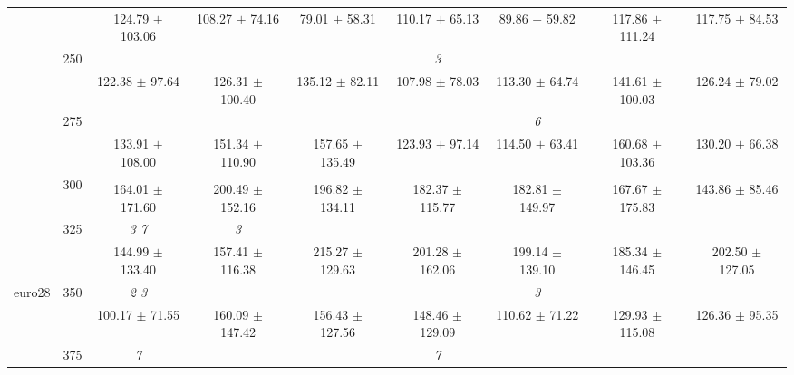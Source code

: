 \begin{table}[h]
{\begin{tabular}{
        ccccccccc}
 & & \cellcolor[HTML]{EFEFEF} 124.79 $\pm$ 103.06& \cellcolor[HTML]{EFEFEF} 108.27 $\pm$ 74.16& \cellcolor[HTML]{EFEFEF} 79.01 $\pm$ 58.31& \cellcolor[HTML]{EFEFEF} 110.17 $\pm$ 65.13& \cellcolor[HTML]{EFEFEF} 89.86 $\pm$ 59.82& \cellcolor[HTML]{EFEFEF} 117.86 $\pm$ 111.24& \cellcolor[HTML]{EFEFEF} 117.75 $\pm$ 84.53 \\ 
 & \multirow{2}{*}{250}& & & & \textit{ 3 }& & &  \\ 
 & & 122.38 $\pm$ 97.64& 126.31 $\pm$ 100.40& 135.12 $\pm$ 82.11& 107.98 $\pm$ 78.03& 113.30 $\pm$ 64.74& 141.61 $\pm$ 100.03& 126.24 $\pm$ 79.02 \\ 
 & \multirow{2}{*}{275}& \cellcolor[HTML]{EFEFEF} & \cellcolor[HTML]{EFEFEF} & \cellcolor[HTML]{EFEFEF} & \cellcolor[HTML]{EFEFEF} & \cellcolor[HTML]{EFEFEF} \textit{ 6 }& \cellcolor[HTML]{EFEFEF} & \cellcolor[HTML]{EFEFEF}  \\ 
 & & \cellcolor[HTML]{EFEFEF} 133.91 $\pm$ 108.00& \cellcolor[HTML]{EFEFEF} 151.34 $\pm$ 110.90& \cellcolor[HTML]{EFEFEF} 157.65 $\pm$ 135.49& \cellcolor[HTML]{EFEFEF} 123.93 $\pm$ 97.14& \cellcolor[HTML]{EFEFEF} 114.50 $\pm$ 63.41& \cellcolor[HTML]{EFEFEF} 160.68 $\pm$ 103.36& \cellcolor[HTML]{EFEFEF} 130.20 $\pm$ 66.38 \\ 
 & \multirow{2}{*}{300}& & & & & & &  \\ 
 & & 164.01 $\pm$ 171.60& 200.49 $\pm$ 152.16& 196.82 $\pm$ 134.11& 182.37 $\pm$ 115.77& 182.81 $\pm$ 149.97& 167.67 $\pm$ 175.83& 143.86 $\pm$ 85.46 \\ 
 & \multirow{2}{*}{325}& \cellcolor[HTML]{EFEFEF} \textit{ 3 7 }& \cellcolor[HTML]{EFEFEF} \textit{ 3 }& \cellcolor[HTML]{EFEFEF} & \cellcolor[HTML]{EFEFEF} & \cellcolor[HTML]{EFEFEF} & \cellcolor[HTML]{EFEFEF} & \cellcolor[HTML]{EFEFEF}  \\ 
 & & \cellcolor[HTML]{EFEFEF} 144.99 $\pm$ 133.40& \cellcolor[HTML]{EFEFEF} 157.41 $\pm$ 116.38& \cellcolor[HTML]{EFEFEF} 215.27 $\pm$ 129.63& \cellcolor[HTML]{EFEFEF} 201.28 $\pm$ 162.06& \cellcolor[HTML]{EFEFEF} 199.14 $\pm$ 139.10& \cellcolor[HTML]{EFEFEF} 185.34 $\pm$ 146.45& \cellcolor[HTML]{EFEFEF} 202.50 $\pm$ 127.05 \\ 
 \multirow{4}{*}{euro28} & \multirow{2}{*}{350}& \textit{ 2 3 }& & & & \textit{ 3 }& &  \\ 
 & & 100.17 $\pm$ 71.55& 160.09 $\pm$ 147.42& 156.43 $\pm$ 127.56& 148.46 $\pm$ 129.09& 110.62 $\pm$ 71.22& 129.93 $\pm$ 115.08& 126.36 $\pm$ 95.35 \\ 
 & \multirow{2}{*}{375}& \cellcolor[HTML]{EFEFEF} \textit{ 7 }& \cellcolor[HTML]{EFEFEF} & \cellcolor[HTML]{EFEFEF} & \cellcolor[HTML]{EFEFEF} \textit{ 7 }& \cellcolor[HTML]{EFEFEF} & \cellcolor[HTML]{EFEFEF} & \cellcolor[HTML]{EFEFEF}  \\ 

\end{tabular}}
\end{table}

